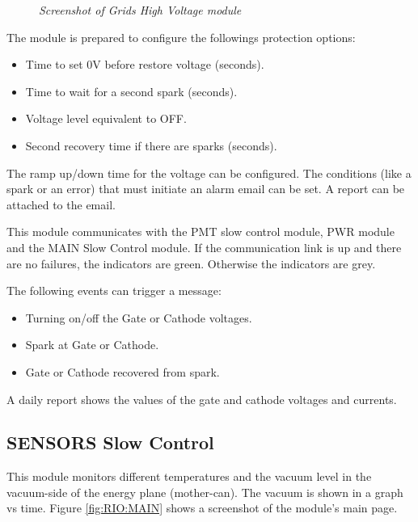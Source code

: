\begin{figure}[ht]
    \bigskip
    \begin{center}\leavevmode
        \caption{\textit{Screenshot of Grids High Voltage module}}
        \label{fig:HHV:MAIN}
    \end{center}
\end{figure}

The module is prepared to configure the followings protection options:

\begin{itemize}
\item Time to set 0V before restore voltage (seconds).
\item Time to wait for a second spark (seconds).
\item Voltage level equivalent to OFF.
\item Second recovery time if there are sparks (seconds).
\end{itemize}

The ramp up/down time for the voltage can be configured. The conditions (like a spark or an error) that must initiate an alarm email can be set. A report can be attached to the email.

This module communicates with the PMT slow control module, PWR module and the MAIN Slow Control module. If the communication link is up and there are no failures, the indicators are green. Otherwise the indicators are grey.

The following events can trigger a message:

\begin{itemize}
\item Turning on/off the Gate or Cathode voltages.
\item Spark at Gate or Cathode.
\item Gate or Cathode recovered from spark.
\end{itemize}

A daily report shows the values of the gate and cathode voltages and currents. 

\subsection{SENSORS Slow Control}

This module monitors different temperatures and the vacuum level in the vacuum-side of the energy plane (mother-can). The vacuum is shown in a graph vs time. Figure \ref{fig:RIO:MAIN} shows a screenshot of the module's main page. 

